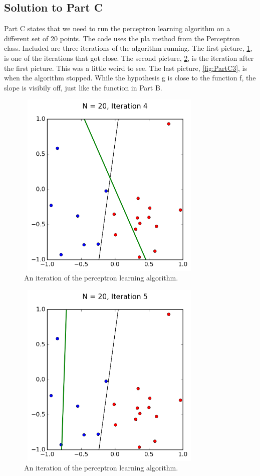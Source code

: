 \documentclass[a4paper]{article}
\begin{document}
\subsection{Solution to Part C}
Part C states that we need to run the perceptron learning algorithm on a different set of 20 points. The code uses the pla method from the Perceptron class. Included are three iterations of the algorithm running. The first picture, \ref{fig:PartC1}, is one of the iterations that got close. The second picture, \ref{fig:PartC2}, is the iteration after the first picture. This was a little weird to see. The last picture, \ref{fig:PartC3}, is when the algorithm stopped. While the hypothesis g is close to the function f, the slope is visibily off, just like the function in Part B.
\begin{figure}
  \includegraphics[width=9cm,height=9cm]{p_N20_it4.png}
  \caption{An iteration of the perceptron learning algorithm.}
  \label{fig:PartC1}
\end{figure}
\begin{figure}
  \includegraphics[width=9cm,height=9cm]{p_N20_it5.png}
  \caption{An iteration of the perceptron learning algorithm.}
  \label{fig:PartC2}
\end{figure}
\end{document}
